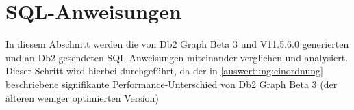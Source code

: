 \section{SQL-Anweisungen}
In diesem Abschnitt werden die von Db2 Graph Beta 3 und V11.5.6.0 generierten und an Db2 gesendeten SQL-Anweisungen miteinander verglichen und analysiert. Dieser Schritt wird hierbei durchgeführt, da der in \autoref{auswertung:einordnung} beschriebene signifikante Performance-Unterschied von Db2 Graph Beta 3 (der älteren weniger optimierten Version)  


\listoftodos